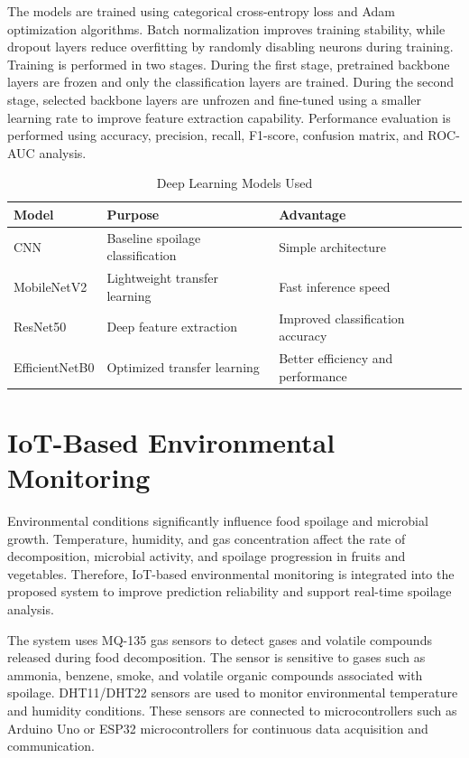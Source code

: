 The models are trained using categorical cross-entropy loss and Adam optimization algorithms. Batch normalization improves training stability, while dropout layers reduce overfitting by randomly disabling neurons during training. Training is performed in two stages. During the first stage, pretrained backbone layers are frozen and only the classification layers are trained. During the second stage, selected backbone layers are unfrozen and fine-tuned using a smaller learning rate to improve feature extraction capability. Performance evaluation is performed using accuracy, precision, recall, F1-score, confusion matrix, and ROC-AUC analysis.

\begin{table}[H]
	\centering
	\caption{Deep Learning Models Used}
	\label{tab:dl_models}
	\begin{tabular}{|l|l|l|}
		\hline
		\textbf{Model} & \textbf{Purpose} & \textbf{Advantage} \\ \hline
		CNN & Baseline spoilage classification & Simple architecture \\ \hline
		MobileNetV2 & Lightweight transfer learning & Fast inference speed \\ \hline
		ResNet50 & Deep feature extraction & Improved classification accuracy \\ \hline
		EfficientNetB0 & Optimized transfer learning & Better efficiency and performance \\ \hline
	\end{tabular}
\end{table}

\section[IoT-Based Environmental Monitoring]{\textbf{IoT-Based Environmental Monitoring}}
Environmental conditions significantly influence food spoilage and microbial growth. Temperature, humidity, and gas concentration affect the rate of decomposition, microbial activity, and spoilage progression in fruits and vegetables. Therefore, IoT-based environmental monitoring is integrated into the proposed system to improve prediction reliability and support real-time spoilage analysis.

The system uses MQ-135 gas sensors to detect gases and volatile compounds released during food decomposition. The sensor is sensitive to gases such as ammonia, benzene, smoke, and volatile organic compounds associated with spoilage. DHT11/DHT22 sensors are used to monitor environmental temperature and humidity conditions. These sensors are connected to microcontrollers such as Arduino Uno or ESP32 microcontrollers for continuous data acquisition and communication.

